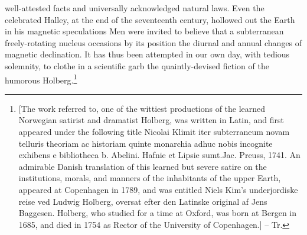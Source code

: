well-attested facts and universally acknowledged natural laws. Even the celebrated Halley, at the end of the seventeenth century, hollowed out the Earth in his magnetic speculations Men were invited to believe that a subterranean freely-rotating nucleus occasions by its position the diurnal and annual changes of magnetic declination. It has thus been attempted in our own day, with tedious solemnity, to clothe in a scientific garb the quaintly-devised fiction of the humorous Holberg.\footnote{[The work referred to, one of the wittiest productions of the learned Norwegian satirist and dramatist Holberg, was written in Latin, and first appeared under the following title Nicolai Klimit iter subterraneum novam telluris theoriam ac historiam quinte monarchia adhuc nobis incognite exhibens e bibliotheca b. Abelini. Hafnie et Lipsie sumt.Jac. Preuss, 1741. An admirable Danish translation of this learned but severe satire on the institutions, morals, and manners of the inhabitants of the upper Earth, appeared at Copenhagen in 1789, and was entitled Niels Kim's underjordiske reise ved Ludwig Holberg, oversat efter den Latinske original af Jens Baggesen. Holberg, who studied for a time at Oxford, was born at Bergen in 1685, and died in 1754 as Rector of the University of Copenhagen.] -- Tr.} 

